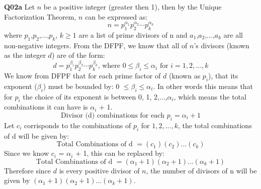 \documentclass[11pt]{article}
\begin{document}
\textbf{Q02a} Let $n$ be a positive integer (greater then 1), then by the Unique Factorization Theorem, $n$ can be expressed as:
\[  n = p_1^{\alpha_1}p_2^{\alpha_2}\cdots p_k^{\alpha_k} \]
where $p_1$,$p_2$,...,$p_k$, $k\geq1$ are a list of prime divisors of n and $a_1$,$a_2$,...,$a_k$ are all non-negative integers. From the DFPF, we know that all of $n$'s divisors (known as the integer $d$) are of the form:
\[  d = p_1^{\beta_1}p_2^{\beta_2}\cdots p_k^{\beta_k} \text{, where } 0\leq\beta_i\leq\alpha_i \text{ for  }  i = 1,2,...,k\]
We know from DFPF that for each prime factor of $d$ (known as $p_i$), that its exponent ($\beta_i$) must be bounded by:  0 $\leq \beta_i \leq \alpha_i$. In other words this means that for $p_i$ the choice of its exponent is between 0, 1, 2,...,$\alpha_i$, which means the total combinations it can have is $\alpha_i$ + 1. 
\[ \text{Divisor (d) combinations for each  } p_i = \alpha_i + 1 \]
Let  $c_i$ corrisponds to the combinations of $p_i$ for $1,2,...,k$, the total combinations of d will be given by:
\[  \text{Total Combinations of d } = (c_1)(c_2)...(c_k) \]
Since we know $c_i$ = $\alpha_i$ + 1, this can be replaced by:
\[  \text{Total Combinations of d } = (\alpha_1 + 1)(\alpha_2 + 1)...(\alpha_k + 1) \]
Therefore since $d$ is every positive divisor of $n$, the number of divisors of n will be given by $(\alpha_1 + 1)(\alpha_2 + 1)...(\alpha_k + 1)$.
\end{document}
